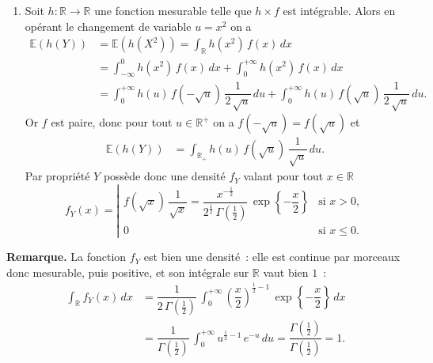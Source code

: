 \begin{enumerate}
\def\labelenumi{\arabic{enumi}.}
\tightlist
\item
  Soit \(h : \mathbb{R}\to \mathbb{R}\) une fonction mesurable telle que
  \(h\times f\) est intégrable. Alors en opérant le changement de
  variable \(u = x^2\) on a \begin{align*}
  \mathbb{E}\left( h(Y) \right) &= \mathbb{E}\left(h(X^2)\right) = \int_{\mathbb{R}} h(x^2)\,f(x)\,dx\\
  & = \int_{-\infty}^{0} h(x^2)\,f(x)\,dx + \int_{0}^{+\infty} h(x^2)\,f(x)\,dx\\
  &= \int_{0}^{+\infty} h(u)\,f\left(-\sqrt{u}\right)\,\dfrac{1}{2\,\sqrt{u}} \,du + \int_{0}^{+\infty} h(u)\,f\left(\sqrt{u}\right)\,\dfrac{1}{2\,\sqrt{u}} \,du.
  \end{align*} Or \(f\) est paire, donc pour tout \(u \in \mathbb{R}^+\)
  on a \(f\left(-\sqrt{u}\right) = f\left(\sqrt{u}\right)\) et
  \begin{align*}
  \mathbb{E}\left( h(Y) \right) &= \int_{\mathbb{R}_+} h(u)\,f\left(\sqrt{u}\right)\,\dfrac{1}{\sqrt{u}} \,du.
  \end{align*} Par propriété \(Y\) possède donc une densité \(f_Y\)
  valant pour tout \(x\in\mathbb{R}\)
  \[f_Y(x) = \left|\begin{array}{ll} f\left(\sqrt{x}\right)\,\dfrac{1}{\sqrt{x}} = \dfrac{x^{-\frac{1}{2}}}{2^{\frac{1}{2}}\,\Gamma\left(\frac{1}{2}\right)}\,\exp\left\{-\dfrac{x}{2}\right\} & \text{si } x > 0,\\ 0 & \text{si } x \leq 0. \end{array}\right. \]
\end{enumerate}

\textbf{Remarque.} La fonction \(f_Y\) est bien une densité~: elle est
continue par morceaux donc mesurable, puis positive, et son intégrale
sur \(\mathbb{R}\) vaut bien \(1\)~: \begin{align*}
\int_{\mathbb{R}} f_Y(x)\,dx &= \dfrac{1}{2\,\Gamma\left(\frac{1}{2}\right)}\,\int_{0}^{+\infty} \left(\dfrac{x}{2}\right)^{\frac{1}{2}-1}\,\exp\left\{-\dfrac{x}{2}\right\}\,dx \\
&= \dfrac{1}{\Gamma\left(\frac{1}{2}\right)}\,\int_{0}^{+\infty} u^{\frac{1}{2}-1}\,e^{-u}\,du = \dfrac{\Gamma\left(\frac{1}{2}\right)}{\Gamma\left(\frac{1}{2}\right)} = 1.
\end{align*}

\label{II-answer-khi2-ndl}

